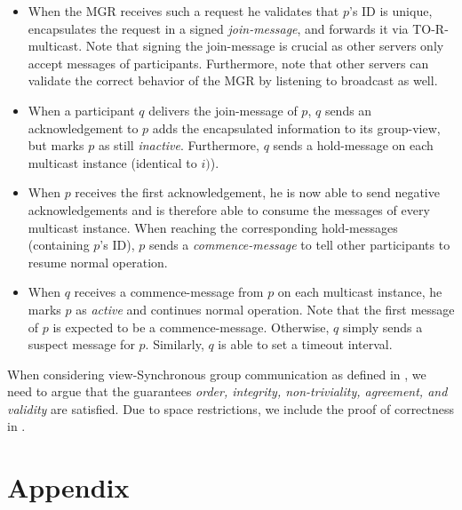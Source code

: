 \documentclass[runningheads]{llncs}
\begin{document}
\begin{enumerate}
\begin{itemize}
        \item When the MGR receives such a request he validates that $p$'s ID is unique, encapsulates the request in a signed \textit{join-message}, and forwards it via TO-R-multicast. Note that signing the join-message is crucial as other servers only accept messages of participants. Furthermore, note that other servers can validate the correct behavior of the MGR by listening to broadcast as well. 
        \item When a participant $q$ delivers the join-message of $p$, $q$ sends an acknowledgement to $p$ adds the encapsulated information to its group-view, but marks $p$ as still \textit{inactive}. Furthermore, $q$ sends a hold-message on each multicast instance (identical to $i)$). 
        \item When $p$ receives the first acknowledgement, he is now able to send negative acknowledgements and is therefore able to consume the messages of every multicast instance. When reaching the corresponding hold-messages (containing $p$'s ID), $p$ sends a \textit{commence-message} to tell other participants to resume normal operation. 
        \item When $q$ receives a commence-message from $p$ on each multicast instance, he marks $p$ as \textit{active} and continues normal operation. Note that the first message of $p$ is expected to be a commence-message. Otherwise, $q$ simply sends a suspect message for $p$. Similarly, $q$ is able to set a timeout interval.
    \end{itemize} 
\end{enumerate}
When considering view-Synchronous group communication as defined in \cite[p. ~772-773]{ds_book}, we need to argue that the guarantees \textit{order, integrity, non-triviality, agreement, and validity} are satisfied. Due to space restrictions, we include the proof of correctness in .

%
%


\newpage 
\appendix
\section{Appendix}
\end{document}
